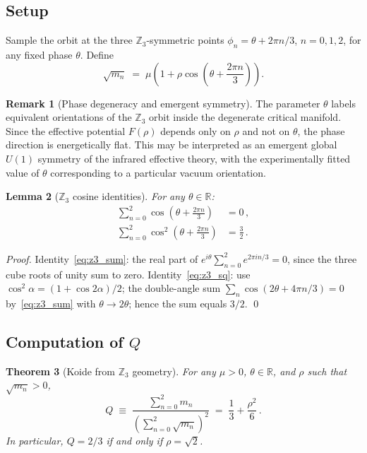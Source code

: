 \documentclass[12pt,a4paper]{article}
\newtheorem{theorem}{Theorem}
\newtheorem{lemma}[theorem]{Lemma}
\theoremstyle{definition}
\newtheorem{remark}[theorem]{Remark}
\newcommand{\R}{\mathbb{R}}
\begin{document}
\subsection{Setup}

Sample the orbit at the three $\mathbb{Z}_3$-symmetric points
$\phi_n = \theta + 2\pi n/3$, $n = 0,1,2$, for any fixed phase $\theta$.
Define
\begin{equation}
  \label{eq:sqrtm_ansatz}
  \sqrt{m_n} \;=\; \mu\!\left(1 + \rho\cos\!\left(\theta + \frac{2\pi n}{3}\right)\right).
\end{equation}

\begin{remark}[Phase degeneracy and emergent symmetry]
The parameter $\theta$ labels equivalent orientations of the
$\mathbb{Z}_3$ orbit inside the degenerate critical manifold.
Since the effective potential $F(\rho)$ depends only on $\rho$
and not on $\theta$, the phase direction is energetically flat.
This may be interpreted as an emergent global $U(1)$ symmetry
of the infrared effective theory, with the experimentally fitted
value of $\theta$ corresponding to a particular vacuum orientation.
\end{remark}

\begin{lemma}[$\mathbb{Z}_3$ cosine identities]
\label{lem:z3}
For any $\theta \in \R$:
\begin{align}
  \label{eq:z3_sum}
  \sum_{n=0}^{2}\cos\!\left(\theta + \frac{2\pi n}{3}\right) &= 0\,,\\
  \label{eq:z3_sq}
  \sum_{n=0}^{2}\cos^2\!\left(\theta + \frac{2\pi n}{3}\right) &= \frac{3}{2}\,.
\end{align}
\end{lemma}

\begin{proof}
Identity~\eqref{eq:z3_sum}: the real part of $e^{i\theta}\sum_{n=0}^2 e^{2\pi in/3} = 0$,
since the three cube roots of unity sum to zero.
Identity~\eqref{eq:z3_sq}: use $\cos^2\alpha = (1+\cos 2\alpha)/2$;
the double-angle sum $\sum_n\cos(2\theta + 4\pi n/3) = 0$ by~\eqref{eq:z3_sum} with
$\theta \to 2\theta$; hence the sum equals $3/2$.
\qed
\end{proof}

\subsection{Computation of $Q$}

\begin{theorem}[Koide from $\mathbb{Z}_3$ geometry]
\label{thm:koide}
For any $\mu > 0$, $\theta \in \R$, and $\rho$ such that $\sqrt{m_n} > 0$,
\begin{equation}
  \label{eq:Q_rho}
  Q \;\equiv\; \frac{\displaystyle\sum_{n=0}^2 m_n}
                    {\displaystyle\left(\sum_{n=0}^2\sqrt{m_n}\right)^2}
  \;=\; \frac{1}{3} + \frac{\rho^2}{6}\,.
\end{equation}
In particular, $Q = 2/3$ if and only if $\rho = \sqrt{2}$.
\end{theorem}
\end{document}
